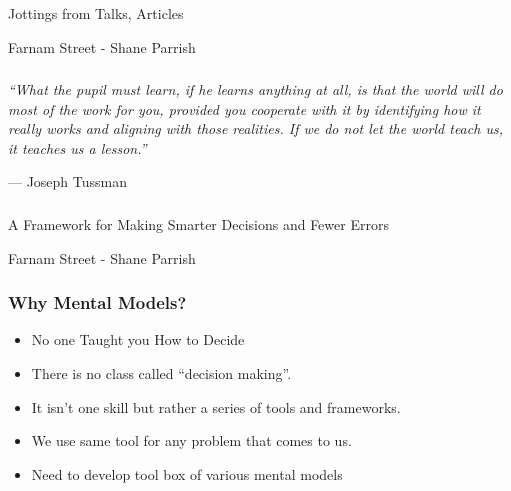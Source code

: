 \begin{frame}[fragile]\frametitle{}
\begin{center}
{\Large Jottings from Talks, Articles}

{\small Farnam Street - Shane Parrish}


\end{center}
\end{frame}



\begin{frame}[fragile]\frametitle{}

\begin{center}
{\it 
``What the pupil must learn, if he learns anything at all, is that the world will do most of the work for you, provided you cooperate with it by identifying how it really works and aligning with those realities. If we do not let the world teach us, it teaches us a lesson.''


— Joseph Tussman
}

\end{center}
	  
\end{frame}

\begin{frame}[fragile]\frametitle{}
\begin{center}
{\large A Framework for Making Smarter Decisions and Fewer Errors}

{\small Farnam Street - Shane Parrish}


\end{center}
\end{frame}



\begin{frame}[fragile]\frametitle{Why Mental Models?}

\begin{itemize}
\item No one Taught you How to Decide
\item There is no class called ``decision making''. 
\item It isn’t one skill but rather a series of tools and frameworks.
\item We use same tool for any problem that comes to us.
\item Need to develop tool box of various mental models
\end{itemize}

\end{frame}


